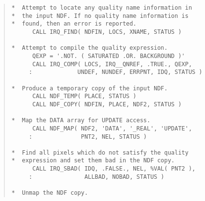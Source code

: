 \begin{quote}
\begin{tabbing}

\verb#*  Attempt to locate any quality name information in   #\\
\verb#*  the input NDF. If no quality name information is    #\\
\verb#*  found, then an error is reported.                   #\\
\verb#      CALL IRQ_FIND( NDFIN, LOCS, XNAME, STATUS )      #\\
\verb#                                                       #\\
\verb#*  Attempt to compile the quality expression.          #\\
\verb#      QEXP = '.NOT. ( SATURATED .OR. BACKGROUND )'     #\\
\verb#      CALL IRQ_COMP( LOCS, IRQ__QNREF, .TRUE., QEXP,   #\\
\verb#     :             UNDEF, NUNDEF, ERRPNT, IDQ, STATUS )#\\
\verb#                                                       #\\
\verb#*  Produce a temporary copy of the input NDF.          #\\
\verb#      CALL NDF_TEMP( PLACE, STATUS )                   #\\
\verb#      CALL NDF_COPY( NDFIN, PLACE, NDF2, STATUS )      #\\
\verb#                                                       #\\
\verb#*  Map the DATA array for UPDATE access.               #\\
\verb#      CALL NDF_MAP( NDF2, 'DATA', '_REAL', 'UPDATE',   #\\
\verb#     :              PNT2, NEL, STATUS )                #\\
\verb#                                                       #\\
\verb#*  Find all pixels which do not satisfy the quality    #\\
\verb#*  expression and set them bad in the NDF copy.        #\\
\verb#      CALL IRQ_SBAD( IDQ, .FALSE., NEL, %VAL( PNT2 ),  #\\
\verb#     :               ALLBAD, NOBAD, STATUS )           #\\
\verb#                                                       #\\
\verb#*  Unmap the NDF copy.                                 #\\

\end{tabbing}
\end{quote}
